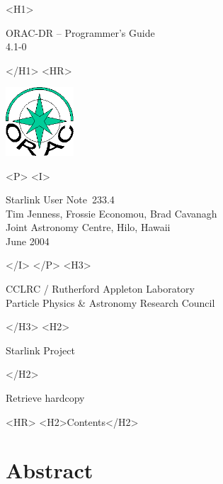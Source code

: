 \documentclass[twoside,11pt]{article}
\newcommand{\stardoccategory}  {Starlink User Note}
\newcommand{\stardocsource}    {sun\stardocnumber}
\newcommand{\stardocnumber}    {233.4}
\newcommand{\stardocauthors}   {Tim Jenness, Frossie Economou, Brad Cavanagh\\
Joint Astronomy Centre, Hilo, Hawaii}
\newcommand{\stardocdate}      {June 2004}
\newcommand{\stardoctitle}     {ORAC-DR -- Programmer's Guide}
\newcommand{\stardocversion}   {4.1-0}
\newcommand{\stardocmanual}    {}
\newcommand{\htmladdnormallink}[2]{#1}
\newcommand{\htmladdimg}[1]{}
\newcommand{\htmlref}[2]{#1}
\newcommand{\htmladdtonavigation}[1]{}
\newcommand{\xlabel}[1]{}
\renewcommand{\_}{\texttt{\symbol{95}}}
\begin{document}
\begin{htmlonly}
   \xlabel{}
   \begin{rawhtml} <H1> \end{rawhtml}
      \stardoctitle\\
      \stardocversion\\
      \stardocmanual
   \begin{rawhtml} </H1> <HR> \end{rawhtml}

\includegraphics[width=1.0in]{sun233_logo}

   \begin{rawhtml} <P> <I> \end{rawhtml}
   \stardoccategory\ \stardocnumber \\
   \stardocauthors \\
   \stardocdate
   \begin{rawhtml} </I> </P> <H3> \end{rawhtml}
      \htmladdnormallink{CCLRC / Rutherford Appleton Laboratory}
                        {http://www.cclrc.ac.uk} \\
      \htmladdnormallink{Particle Physics \& Astronomy Research Council}
                        {http://www.pparc.ac.uk} \\
   \begin{rawhtml} </H3> <H2> \end{rawhtml}
      \htmladdnormallink{Starlink Project}{http://www.starlink.rl.ac.uk/}
   \begin{rawhtml} </H2> \end{rawhtml}
   \htmladdnormallink{\htmladdimg{source.gif} Retrieve hardcopy}
      {http://www.starlink.rl.ac.uk/cgi-bin/hcserver?\stardocsource}\\

  \label{stardoccontents}
  \begin{rawhtml} 
    <HR>
    <H2>Contents</H2>
  \end{rawhtml}
  \htmladdtonavigation{\htmlref{\htmladdimg{contents_motif.gif}}
        {stardoccontents}}

  \section{\xlabel{abstract}Abstract}
\end{htmlonly}
\end{document}
